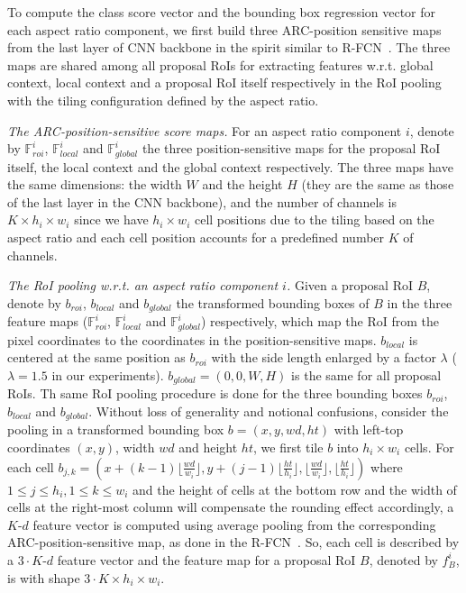 \documentclass[10pt,twocolumn,letterpaper]{article}
\begin{document}
To compute the class score vector and the bounding box regression vector for each aspect ratio component, we first build three ARC-position sensitive maps from the last layer of CNN backbone in the spirit similar to R-FCN~\cite{rfcn}. The three maps are shared among all proposal RoIs for extracting features w.r.t. global context, local context and a proposal RoI itself respectively in the RoI pooling with the tiling configuration defined by the aspect ratio. 

\textit{The ARC-position-sensitive score maps.} For an aspect ratio component $i$, denote by $\mathbb{F}^i_{roi}$, $\mathbb{F}^i_{local}$ and $\mathbb{F}^i_{global}$ the three position-sensitive maps for the proposal RoI itself,  the local context and the global context respectively. The three maps have the same dimensions: the width $W$ and the height $H$ (they are the same as those of the last layer in the CNN backbone), and the number of channels is $K\times h_i\times w_i$ since we have $h_i\times w_i$ cell positions due to the tiling based on the aspect ratio and each cell position accounts for a predefined number $K$ of channels. 

\textit{The RoI pooling w.r.t. an aspect ratio component $i$.} Given a proposal RoI $B$, denote by $b_{roi}$, $b_{local}$ and $b_{global}$ the transformed bounding boxes of $B$ in the three feature maps ($\mathbb{F}^i_{roi}$,  $\mathbb{F}^i_{local}$ and $\mathbb{F}^i_{global}$) respectively, which map the RoI from the pixel coordinates to the coordinates in the position-sensitive maps. $b_{local}$ is centered at the same position as $b_{roi}$ with the side length enlarged by a factor $\lambda$ ($\lambda=1.5$ in our experiments). $b_{global}=(0, 0, W, H)$ is the same for all proposal RoIs. Th same RoI pooling procedure is done for the three bounding boxes $b_{roi}$, $b_{local}$ and $b_{global}$. Without loss of generality and notional confusions, consider the pooling in a transformed bounding box $b=(x,y,wd,ht)$ with left-top coordinates $(x,y)$, width $wd$ and height $ht$, we first tile $b$ into $h_i\times w_i$ cells.  For each cell $b_{j,k}=(x+(k-1)\lfloor \frac{wd}{w_i} \rfloor, y+(j-1)\lfloor \frac{ht}{h_i}\rfloor, \lfloor \frac{wd}{w_i} \rfloor, \lfloor \frac{ht}{h_i}\rfloor)$ where $1\leq j \leq h_i, 1\leq k \leq w_i$ and the height of cells at the bottom row and the width of cells at the right-most column will compensate the rounding effect accordingly, a $K$-$d$ feature vector is computed using average pooling from the corresponding ARC-position-sensitive map, as done in the R-FCN~\cite{rfcn}. So, each cell is described by a $3\cdot K$-$d$ feature vector and the feature map for a proposal RoI $B$, denoted by $f^i_B$, is with shape $3\cdot K\times h_i \times w_i$. 
\end{document}
